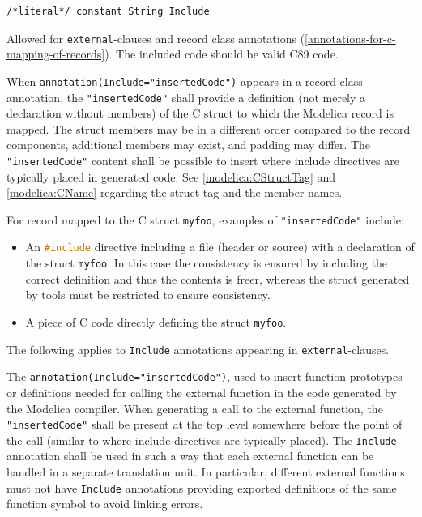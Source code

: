 \begin{annotationdefinition}[Include]
\begin{synopsis}\begin{lstlisting}
/*literal*/ constant String Include
\end{lstlisting}\end{synopsis}
\begin{semantics}
Allowed for \lstinline!external!-clauses and record class annotations (\cref{annotations-for-c-mapping-of-records}).
The included code should be valid C89 code.

When \lstinline!annotation(Include="insertedCode")! appears in a record class annotation, the \lstinline!"insertedCode"! shall provide a definition (not merely a declaration without members) of the C struct to which the Modelica record is mapped.
The struct members may be in a different order compared to the record components, additional members may exist, and padding may differ.
The \lstinline!"insertedCode"! content shall be possible to insert where include directives are typically placed in generated code.
See \cref{modelica:CStructTag} and \cref{modelica:CName} regarding the struct tag and the member names.

\begin{nonnormative}
For record mapped to the C struct \lstinline[language=C]!myfoo!, examples of \lstinline!"insertedCode"! include:
\begin{itemize}
\item
  An \lstinline[language=C]!#include! directive including a file (header or source) with a declaration of the struct \lstinline[language=C]!myfoo!.
  In this case the consistency is ensured by including the correct definition and thus the contents is freer, whereas the struct generated by tools must be restricted to ensure consistency.
\item
  A piece of C code directly defining the struct \lstinline[language=C]!myfoo!.
\end{itemize}
\end{nonnormative}

The following applies to \lstinline!Include! annotations appearing in \lstinline!external!-clauses.

The {\lstinline!annotation(Include="insertedCode")!}, used to insert function prototypes or definitions needed for calling the external function in the code generated by the Modelica compiler.
When generating a call to the external function, the \lstinline!"insertedCode"! shall be present at the top level somewhere before the point of the call (similar to where include directives are typically placed).
The \lstinline!Include! annotation shall be used in such a way that each external function can be handled in a separate translation unit.
In particular, different external functions must not have \lstinline!Include! annotations providing exported definitions of the same function symbol to avoid linking errors.


\end{semantics}
\end{annotationdefinition}

